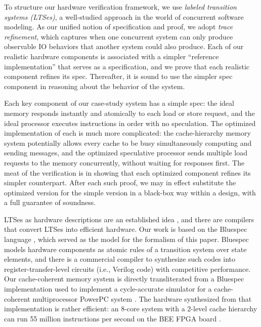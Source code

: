 To structure our hardware verification framework, we use \emph{labeled
transition systems (LTSes)}, a well-studied approach in the world of
concurrent software modeling.  As our unified notion of specification and
proof, we adopt \emph{trace refinement}, which captures when one concurrent
system can only produce observable IO behaviors that another system could also
produce.  Each of our realistic hardware components is associated with a
simpler ``reference implementation'' that serves as a specification, and we
prove that each realistic component refines its spec.  Thereafter, it is sound
to use the simpler spec component in reasoning about the behavior of the
system.

Each key component of our case-study system has a simple spec: the ideal memory
responds instantly and atomically to each load or store request, and the ideal
processor executes instructions in order with no speculation.  The optimized
implementation of each is much more complicated: the cache-hierarchy memory
system potentially allows every cache to be busy simultaneously computing and
sending messages, and the optimized speculative processor sends multiple load
requests to the memory concurrently, without waiting for responses first.  The meat
of the verification is in showing that each optimized component refines its
simpler counterpart.  After each such proof, we may in effect substitute the
optimized version for the simple version in a black-box way within a design,
with a full guarantee of soundness.

LTSes as hardware descriptions are an established
idea \cite{HoeArvind:TRSSynthesis1, Hoe:TCAD}, and there are compilers that
convert LTSes into efficient hardware.  Our work is based on the Bluespec
language \cite{BSV:LangRef, Bluespec:TFRG}, which served as the model for the
formalism of this paper.  Bluespec models hardware components as atomic rules
of a transition system over state elements, and there is a commercial compiler
to synthesize such codes into register-transfer-level circuits (i.e., Verilog code) with
competitive performance.  Our cache-coherent memory system is directly
transliterated from a Bluespec
implementation \cite{DNA:CoherenceImplementation} used to implement a
cycle-accurate simulator for a cache-coherent multiprocessor PowerPC system \cite{Khan:PowerPc}. The hardware synthesized
from that implementation is rather efficient: an 8-core system with a 2-level
cache hierarchy can run 55 million instructions per second on the BEE FPGA
board \cite{bee2}.

